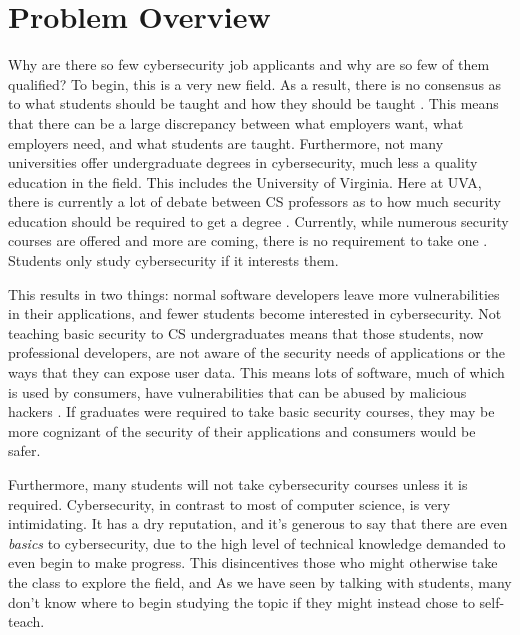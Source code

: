\documentclass[openright]{report}
\begin{document}
\section{Problem Overview}

\par Why are there so few cybersecurity job applicants and why are so few of them qualified? To begin, this is a very new field. As a result, there is no consensus as to what students should be taught and how they should be taught \cite{why_no_cyber_classes}. This means that there can be a large discrepancy between what employers want, what employers need, and what students are taught. Furthermore, not many universities offer undergraduate degrees in cybersecurity, much less a quality education in the field. This includes the University of Virginia. Here at UVA, there is currently a lot of debate between CS professors as to how much security education should be required to get a degree \cite{ibrahiminterview}. Currently, while numerous security courses are offered and more are coming, there is no requirement to take one \cite{comsci_handbook}. Students only study cybersecurity if it interests them.

\par This results in two things: normal software developers leave more vulnerabilities in their applications, and fewer students become interested in cybersecurity. Not teaching basic security to CS undergraduates means that those students, now professional developers, are not aware of the security needs of applications or the ways that they can expose user data. This means lots of software, much of which is used by consumers, have vulnerabilities that can be abused by malicious hackers \cite{why_no_cyber_classes}. If graduates were required to take basic security courses, they may be more cognizant of the security of their applications and consumers would be safer.

\par Furthermore, many students will not take cybersecurity courses unless it is required. Cybersecurity, in contrast to most of computer science, is very intimidating. It has a dry reputation, and it's generous to say that there are even \textit{basics} to cybersecurity, due to the high level of technical knowledge demanded to even begin to make progress. This disincentives those who might otherwise take the class to explore the field, and As we have seen by talking with students, many don't know where to begin studying the topic if they might instead chose to self-teach. 
\end{document}
